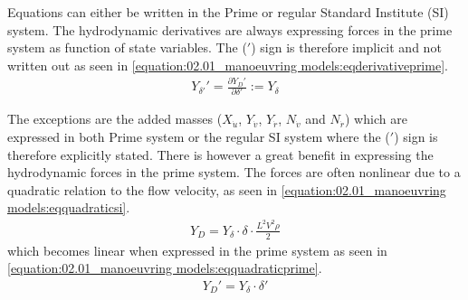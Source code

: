 Equations can either be written in the Prime or regular Standard Institute (SI) system. The hydrodynamic derivatives are always expressing forces in the prime system as function of state variables. The (\('\)) sign is therefore implicit and not written out as seen in \autoref{equation:02.01_manoeuvring models:eqderivativeprime}.
\begin{equation}\label{equation:02.01_manoeuvring models:eqderivativeprime}
\begin{split}\displaystyle Y_{\delta'}'=\frac{\partial Y_D'}{\partial \delta'} := Y_{\delta} \end{split}
\end{equation}

The exceptions are the added masses (\(X_{\dot{u}}\), \(Y_{\dot{v}}\), \(Y_{\dot{r}}\), \(N_{\dot{v}}\) and \(N_{\dot{r}}\)) which are expressed in both Prime system or the regular SI system where the (\('\)) sign is therefore
explicitly stated.
There is however a great benefit in expressing the hydrodynamic forces in the prime system. The forces are often nonlinear due to a quadratic relation to the flow velocity, as seen in \autoref{equation:02.01_manoeuvring models:eqquadraticsi}.
\begin{equation}\label{equation:02.01_manoeuvring models:eqquadraticsi}
\begin{split}\displaystyle Y_{D}=Y_{\delta} \cdot \delta \cdot \frac{L^2V^2\rho}{2}\end{split}
\end{equation}
which becomes linear when expressed in the prime system as seen in \autoref{equation:02.01_manoeuvring models:eqquadraticprime}.
\begin{equation}\label{equation:02.01_manoeuvring models:eqquadraticprime}
\begin{split}\displaystyle Y_{D}'=Y_{\delta} \cdot \delta'\end{split}
\end{equation}